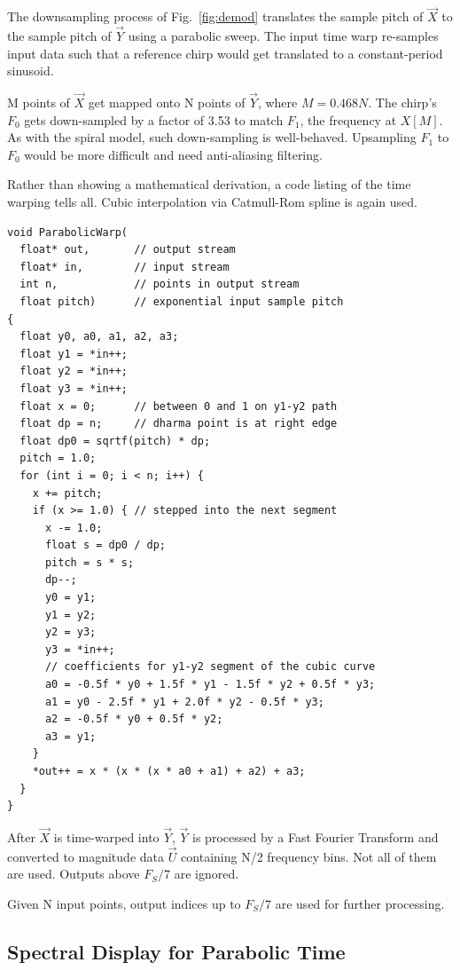 The downsampling process of Fig.~\ref{fig:demod} translates the sample pitch of
$\vec{X}$ to the sample pitch of $\vec{Y}$ using a parabolic sweep.
The input time warp re-samples input data such that a reference chirp would get
translated to a constant-period sinusoid.

M points of $\vec{X}$ get mapped onto N points of $\vec{Y}$, where $M = 0.468N$.
The chirp's $F_0$ gets down-sampled by a factor of 3.53 to match $F_1$,
the frequency at $X[M]$.
As with the spiral model, such down-sampling is well-behaved.
Upsampling $F_1$ to $F_0$ would be more difficult and need anti-aliasing filtering.

Rather than showing a mathematical derivation,
a code listing of the time warping tells all. 
Cubic interpolation via Catmull-Rom spline is again used.

\begin{lstlisting}[float,floatplacement=H]
void ParabolicWarp(
  float* out,       // output stream
  float* in,        // input stream
  int n,            // points in output stream
  float pitch)      // exponential input sample pitch
{
  float y0, a0, a1, a2, a3;
  float y1 = *in++;
  float y2 = *in++;
  float y3 = *in++;
  float x = 0;      // between 0 and 1 on y1-y2 path
  float dp = n;     // dharma point is at right edge
  float dp0 = sqrtf(pitch) * dp;
  pitch = 1.0;
  for (int i = 0; i < n; i++) {
    x += pitch;
    if (x >= 1.0) { // stepped into the next segment
      x -= 1.0;
      float s = dp0 / dp;
      pitch = s * s;
      dp--;
      y0 = y1;
      y1 = y2;
      y2 = y3;
      y3 = *in++;
      // coefficients for y1-y2 segment of the cubic curve
      a0 = -0.5f * y0 + 1.5f * y1 - 1.5f * y2 + 0.5f * y3;
      a1 = y0 - 2.5f * y1 + 2.0f * y2 - 0.5f * y3;
      a2 = -0.5f * y0 + 0.5f * y2;
      a3 = y1;
    }
    *out++ = x * (x * (x * a0 + a1) + a2) + a3;
  }
}
\end{lstlisting}

After $\vec{X}$ is time-warped into $\vec{Y}$, $\vec{Y}$ is processed by a
Fast Fourier Transform and converted to magnitude data $\vec{U}$ containing N/2
frequency bins. Not all of them are used.
Outputs above $F_S / 7$ are ignored.

Given N input points, output indices up to $F_S / 7$
are used for further processing.

\subsection{Spectral Display for Parabolic Time}

